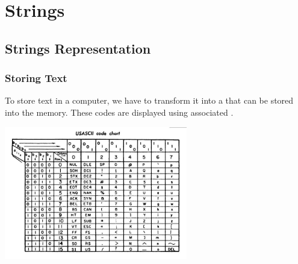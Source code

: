 \section{Strings}
\subsection{Strings Representation}

\begin{frame}
  \frametitle{Storing Text}
  \begin{block}{}
    To store text in a computer, we have to transform it into a
     that can be stored into the memory. These codes
    are displayed using associated .
  \end{block}
  \begin{center}
  \includegraphics[width=0.6\textwidth]{img/ASCIItableOld}
  \end{center}
\end{frame}

